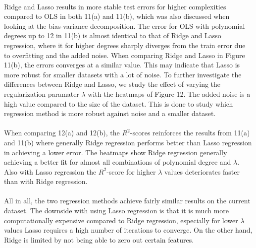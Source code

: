 \documentclass[a4paper,twocolumn]{article}
\begin{document}
\\
Ridge and Lasso results in more stable test errors for higher complexities compared to OLS in both 11(a) and 11(b), which was also discussed when looking at the bias-variance decomposition. The error for OLS with polynomial degrees up to 12 in 11(b) is almost identical to that of Ridge and Lasso regression, where it for higher degrees sharply diverges from the train error due to overfitting and the added noise. When comparing Ridge and Lasso in Figure 11(b), the errors converges at a similar value. This may indicate that Lasso is more robust for smaller datasets with a lot of noise. To further investigate the differences between Ridge and Lasso, we study the effect of varying the regularization paramater $\lambda$ with the heatmaps of Figure 12. The added noise is a high value compared to the size of the dataset. This is done to study which regression method is more robust against noise and a smaller dataset.\\
\\
When comparing 12(a) and 12(b), the $R^{2}$-scores reinforces the results from 11(a) and 11(b) where generally Ridge regression performs better than Lasso regression in achieving a lower error. The heatmaps show Ridge regression generally achieving a better fit for almost all combinations of polynomial degree and $\lambda$. Also with Lasso regression the $R^{2}$-score for higher $\lambda$ values deteriorates faster than with Ridge regression. \\
\\
All in all, the two regression methods achieve fairly similar results on the current dataset. The downside with using Lasso regression is that it is much more computationally expensive compared to Ridge regression, especially for lower $\lambda$ values Lasso requires a high number of iterations to converge. On the other hand, Ridge is limited by not being able to zero out certain features. \\
\end{document}
